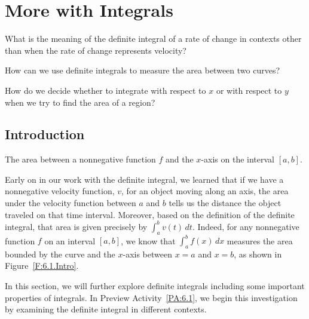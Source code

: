 \section{More with Integrals} \label{S:4.7.MoreIntegrals}

\begin{goals}
\item What is the meaning of the definite integral of a rate of change in contexts other than when the rate of change represents velocity?	
\item How can we use definite integrals to measure the area between two curves?
\item How do we decide whether to integrate with respect to $x$ or with respect to $y$ when we try to find the area of a region?
\end{goals} 


\subsection*{Introduction}

\begin{marginfigure}[2in] %
\caption{The area between a nonnegative function $f$ and the $x$-axis on the interval $[a,b]$.} \label{F:4.7.Intro}
\end{marginfigure}

Early on in our work with the definite integral, we learned that if we have a nonnegative velocity function, $v$, for an object moving along an axis, the area under the velocity function between $a$ and $b$ tells us the distance the object traveled on that time interval.  Moreover, based on the definition of the definite integral, that area is given precisely by $\int_a^b v(t) \, dt$.  Indeed, for any nonnegative function $f$ on an interval $[a,b]$, we know that $\int_a^b f(x) \, dx$ measures the area bounded by the curve and the $x$-axis between $x = a$ and $x = b$, as shown in Figure~\ref{F:6.1.Intro}.

In this section, we will further explore definite integrals including some important properties of integrals.  In Preview Activity~\ref{PA:6.1}, we begin this investigation by examining the definite integral in different contexts. %


